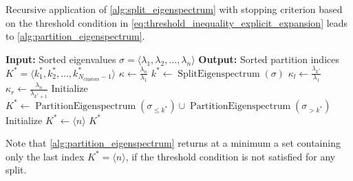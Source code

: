 Recursive application of \cref{alg:split_eigenspectrum} with stopping criterion based on the threshold condition in \cref{eq:threshold_inequality_explicit_expansion} leads to \cref{alg:partition_eigenspectrum}.
\begin{algorithm}[H]
    \caption{$\operatorname{PartitionEigenspectrum}(\sigma)$}
    \begin{algorithmic}[1]
        \State \textbf{Input:} Sorted eigenvalues $\sigma = \langle\lambda_1, \lambda_2, \ldots, \lambda_n\rangle$
        \State \textbf{Output:} Sorted partition indices $K^* = \langle k^*_1, k^*_2, \ldots, k^*_{N_{\text{clusters}}-1}\rangle$
        \State $\kappa \gets \frac{\lambda_n}{\lambda_1}$
        \State $k^* \gets \operatorname{SplitEigenspectrum}(\sigma)$
        \State $\kappa_l \gets \frac{\lambda_{k^*}}{\lambda_1}$
        \State $\kappa_r \gets \frac{\lambda_n}{\lambda_{k^*+1}}$
            \State Initialize $K^* \gets \operatorname{PartitionEigenspectrum}(\sigma_{\leq k^*}) \cup \operatorname{PartitionEigenspectrum}(\sigma_{>k^*})$ 
        \Else
            \State Initialize $K^* \gets \langle n \rangle$ 
        \EndIf
        \State \Return $K^*$
    \end{algorithmic}
    \label{alg:partition_eigenspectrum}
\end{algorithm}
Note that \cref{alg:partition_eigenspectrum} returns at a minimum a set containing only the last index $K^*= \langle n \rangle$, if the threshold condition is not satisfied for any split.

